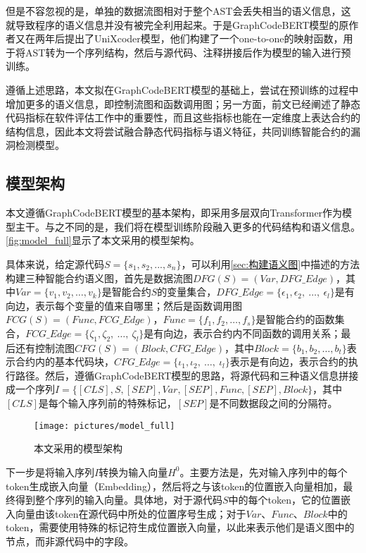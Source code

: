 但是不容忽视的是，单独的数据流图相对于整个AST会丢失相当的语义信息，这就导致程序的语义信息并没有被完全利用起来。于是GraphCodeBERT模型的原作者又在两年后提出了UniXcoder模型\cite{unixcoder}，他们构建了一个one-to-one的映射函数，用于将AST转为一个序列结构，然后与源代码、注释拼接后作为模型的输入进行预训练。

遵循上述思路，本文拟在GraphCodeBERT模型的基础上，尝试在预训练的过程中增加更多的语义信息，即控制流图和函数调用图；另一方面，前文已经阐述了静态代码指标在软件评估工作中的重要性，而且这些指标也能在一定维度上表达合约的结构信息，因此本文将尝试融合静态代码指标与语义特征，共同训练智能合约的漏洞检测模型。

\subsection{模型架构}
\label{sec:模型架构}
本文遵循GraphCodeBERT模型的基本架构，即采用多层双向Transformer作为模型主干。与之不同的是，我们将在模型训练阶段融入更多的代码结构和语义信息。\autoref{fig:model_full}显示了本文采用的模型架构。%


具体来说，给定源代码$S=\{s_{1},s_{2},...,s_{n}\}$，可以利用\autoref{sec:构建语义图}中描述的方法构建三种智能合约语义图，首先是数据流图$DFG(S)=(Var,DFG\_Edge)$，其中$Var=\{v_1,v_2,\ldots,v_k\}$是智能合约$S$的变量集合，$DFG\_Edge=\{\epsilon_1,\epsilon_2,~\ldots,~\epsilon_l\}$是有向边，表示每个变量的值来自哪里；然后是函数调用图$FCG(S)=(Func,FCG\_Edge)$，$Func=\{f_1,f_2,\ldots,f_s\}$是智能合约的函数集合，$FCG\_Edge=\{\zeta_1,\zeta_2,~\ldots,~\zeta_l\}$是有向边，表示合约内不同函数的调用关系；最后还有控制流图$CFG(S)=(Block,CFG\_Edge)$，其中$Block=\{b_1,b_2,\ldots,b_t\}$表示合约内的基本代码块，$CFG\_Edge=\{\iota_1,\iota_2,~\ldots,~\iota_l\}$表示是有向边，表示合约的执行路径。然后，遵循GraphCodeBERT模型的思路，将源代码和三种语义信息拼接成一个序列$I=\{[CLS],S,[SEP],Var,[SEP],Func,[SEP],Block\}$，其中$[CLS]$是每个输入序列前的特殊标记，$[SEP]$是不同数据段之间的分隔符。
\begin{figure}[htbp]
    \centering
    \texttt{[image: pictures/model\_full]}
    \caption{\label{fig:model_full}本文采用的模型架构}
\end{figure}

下一步是将输入序列$I$转换为输入向量$H^0$。主要方法是，先对输入序列中的每个token生成嵌入向量（Embedding），然后将之与该token的位置嵌入向量相加，最终得到整个序列的输入向量。具体地，对于源代码$S$中的每个token，它的位置嵌入向量由该token在源代码中所处的位置序号生成；对于$Var$、$Func$、$Block$中的token，需要使用特殊的标记符生成位置嵌入向量，以此来表示他们是语义图中的节点，而非源代码中的字段。

